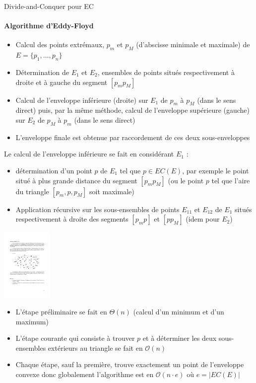 \documentclass[aspectratio=1610,francais,envcountsect]{beamer}
\begin{document}
\begin{frame}[allowframebreaks]{Divide-and-Conquer pour EC}
  \framesubtitle{Algorithme d'Eddy-Floyd}

  \begin{itemize}
  \item Calcul des points extrémaux, $p_m$ et $p_M$ (d’abscisse
    minimale et maximale) de $E = \{p_1, \ldots , p_n\}$
  \item Détermination de $E_1$ et $E_2$, ensembles de points situés
    respectivement à droite et à gauche du segment $[p_mp_M]$
  \item Calcul de l’enveloppe inférieure (droite) sur $E_1$ de $p_m$ à
    $p_M$ (dans le sens direct) puis, par la même méthode, calcul de
    l’enveloppe supérieure (gauche) sur $E_2$ de $p_M$ à $p_m$ (dans
    le sens direct)
  \item L’enveloppe finale est obtenue par raccordement de ces deux
    sous-enveloppes
  \end{itemize}

  \framebreak

  Le calcul de l’enveloppe inférieure se fait en considérant $E_1$ :
  \begin{itemize}
  \item détermination d’un point $p$ de $E_1$ tel que $p \in EC(E)$,
    par exemple le point situé à plus grande distance du segment
    $[p_mp_M]$ (ou le point $p$ tel que l’aire du triangle
    $[p_m,p,p_M]$ soit maximale)
  \item Application récursive sur les sous-ensembles de points
    $E_{11}$ et $E_{12}$ de $E_1$ situés respectivement à droite des
    segments $[p_mp]$ et $[pp_M]$ (idem pour $E_2$)
  \end{itemize}
  
  \begin{center}
    \includegraphics[height=3.5cm]{eddyfloyd.pdf}
  \end{center}

  \framebreak

  \begin{itemize}
  \item L’étape préliminaire se fait en $\Theta(n)$ (calcul d’un
    minimum et d’un maximum)
  \item L’étape courante qui consiste à trouver $p$ et à déterminer
    les deux sous-ensembles extérieurs au triangle se fait en
    $\mathcal{O}(n)$
  \item Chaque étape, sauf la première, trouve exactement un point de
    l’enveloppe convexe donc globalement l’algorithme est en
    $\mathcal{O}(n \cdot e)$ où $e = |EC(E)|$
  \end{itemize}
\end{frame}
\end{document}
